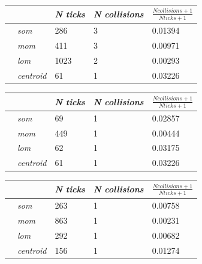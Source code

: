 \documentclass[conference]{IEEEtran}
\begin{document}
\begin{center}
\begin{tabular}{ | m{2.8em} | m{3em} | m{2.8em} | m{5em} | m{5.2em} | }
\hline
{} & \textit{N ticks} & \textit{N collisions} & $\frac{N collisions + 1}{N ticks + 1}$ \\
\hline
{} & \textit{som} & 286 & 3 & 0.01394 \\
 & \textit{mom} & 411 & 3 & 0.00971 \\
 & \textit{lom} & 1023 & 2 & 0.00293 \\
 & \textit{centroid} & 61 & 1 & 0.03226 \\
\hline
\end{tabular}
\label{table:ps5e1amax}
\end{center}

\begin{center}
\begin{tabular}{ | m{2.8em} | m{3em} | m{2.8em} | m{5em} | m{5.2em} | }
\hline
{} & \textit{N ticks} & \textit{N collisions} & $\frac{N collisions + 1}{N ticks + 1}$ \\
\hline
{} & \textit{som} & 69 & 1 & 0.02857 \\
 & \textit{mom} & 449 & 1 & 0.00444 \\
 & \textit{lom} & 62 & 1 & 0.03175 \\
 & \textit{centroid} & 61 & 1 & 0.03226 \\
\hline
\end{tabular}
\label{table:ps5e1asum}
\end{center}


\begin{center}
\begin{tabular}{ | m{2.8em} | m{3em} | m{2.8em} | m{5em} | m{5.2em} | }
\hline
{} & \textit{N ticks} & \textit{N collisions} & $\frac{N collisions + 1}{N ticks + 1}$ \\
\hline
{} & \textit{som} & 263 & 1 & 0.00758 \\
 & \textit{mom} & 863 & 1 & 0.00231 \\
 & \textit{lom} & 292 & 1 & 0.00682 \\
 & \textit{centroid} & 156 & 1 & 0.01274 \\
\hline
\end{tabular}
\label{table:ps5e2amax}
\end{center}
\end{document}
